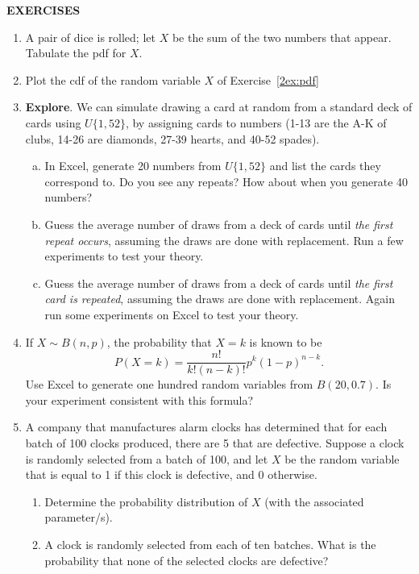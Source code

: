 \fi

\newpage

\begin{center}
	\textbf{EXERCISES}
\end{center}

\begin{enumerate}[label={2.\arabic*},leftmargin=1cm]
	\item A pair of dice is rolled; let $X$ be the sum of the two numbers that appear. Tabulate the pdf for $X$. \label{2ex:pdf}
	\item Plot the cdf of the random variable $X$ of Exercise~\ref{2ex:pdf}
	\item \textbf{Explore}. We can simulate drawing a card at random from a standard deck of cards using $U\{1,52\}$, by assigning cards to numbers (1-13 are the A-K of clubs, 14-26 are diamonds, 27-39 hearts, and 40-52 spades).
		\begin{enumerate}[(a)]
			\item In Excel, generate 20 numbers from $U\{1,52\}$ and list the cards they correspond to. Do you see any repeats? How about when you generate 40 numbers?
			\item Guess the average number of draws from a deck of cards until \emph{the first repeat occurs}, assuming the draws are done with replacement. Run a few experiments to test your theory.
			\item Guess the average number of draws from a deck of cards until \emph{the first card is repeated}, assuming the draws are done with replacement. Again run some experiments on Excel to test your theory.
		\end{enumerate}
	      \item If $X \sim B(n,p)$, the probability that $X = k$ is known to be $$P(X = k) = \frac{n!}{k!(n-k)!}p^k(1-p)^{n-k}.$$ Use Excel to generate one hundred random variables from $B(20,0.7)$. Is your experiment consistent with this formula?
  \item A company that manufactures alarm clocks has determined that for each batch of 100 clocks produced, there are 5 that are defective. Suppose a clock is randomly selected from a batch of 100, and let $X$ be the random variable that is equal to 1 if this clock is defective, and 0 otherwise.
	  \begin{enumerate}
		  \item Determine the probability distribution of $X$ (with the associated parameter/s).
		  \item A clock is randomly selected from each of ten batches. What is the probability that none of the selected clocks are defective?

\end{enumerate}
\end{enumerate}
